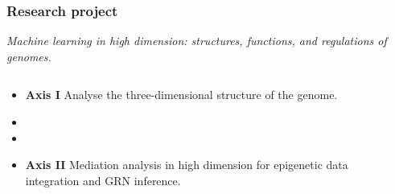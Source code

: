 \documentclass[11pt,xcolor=dvipsnames]{beamer}
\begin{document}
\begin{frame}
\frametitle{Research project}
\vspace{-2em}
\begin{center}
\em
\color{red}
Machine learning in high dimension: structures, functions, and regulations of
genomes.
\end{center}

\begin{overlayarea}{12cm}{5cm}
\small
{}


\begin{columns}
\begin{column}{0.7\linewidth}
\begin{itemize}[leftmargin=*]
\footnotesize
\item<4-> {\bf Axis I} \quad Analyse the three-dimensional structure of the
genome.
\item<4->
\item<4->
\item<5-> {\bf Axis II} \quad Mediation analysis in high dimension for
epigenetic data integration and GRN inference.
\end{itemize}
\end{column}
\begin{column}{0.3\linewidth}
\begin{overlayarea}{0.9\linewidth}{2cm}
\end{overlayarea}
\end{column}
\end{columns}
\end{overlayarea}
\end{frame}
\end{document}
